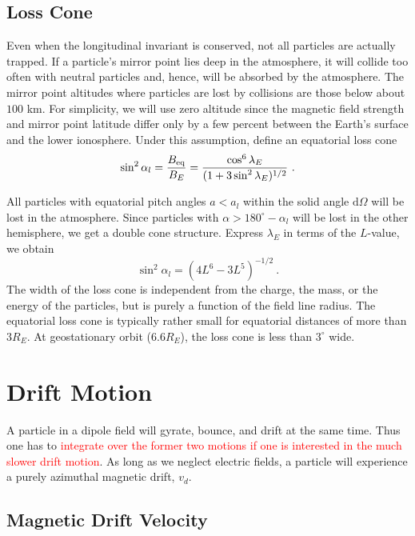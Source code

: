\documentclass[12pt,a4paper]{article}
\newcommand{\dif}{\mathrm{d}}
\begin{document}
\subsection{Loss Cone}
Even when the longitudinal invariant is conserved, not all particles are actually trapped. If a particle's mirror point lies deep in the atmosphere, it will collide too often with neutral particles and, hence, will be absorbed by the atmosphere. The mirror point altitudes where particles are lost by collisions are those below about $100$ km. For simplicity, we will use zero altitude since the magnetic field strength and mirror point latitude differ only by a few percent between the Earth's surface and the lower ionosphere. Under this assumption, define an equatorial loss cone
\begin{equation}
\sin^2 \alpha_l = \dfrac{B_{\rm eq}}{B_E} = \dfrac{\cos^6 \lambda_E}{(1+3 \sin^2 \lambda_E)^{1/2} } ~. 
\end{equation}

All particles with equatorial pitch angles $a < a_l$ within the solid angle $\dif \Omega$ will be lost in the atmosphere. Since particles with $\alpha > 180^\circ - \alpha_l$ will be lost in the other hemisphere, we get a double cone structure. Express $\lambda_E$ in terms of the $L$-value, we obtain
\begin{equation}
\sin^2 \alpha_l = (4L^6 -3L^5)^{-1/2} ~.
\end{equation}
The width of the loss cone is independent from the charge, the mass, or the energy of the particles, but is purely a function of the field line radius. The equatorial loss cone is typically rather small for equatorial distances of more than $3 R_E$. At geostationary orbit ($6.6 R_E$), the loss cone is less than $3^\circ$ wide.

\section{Drift Motion}
A particle in a dipole field will gyrate, bounce, and drift at the same time. Thus one has to \textcolor{red}{integrate over the former two motions if one is interested in the much slower drift motion}. As long as we neglect electric fields, a particle will experience a purely azimuthal magnetic drift, $v_d$.


\subsection{Magnetic Drift Velocity}
\end{document}
